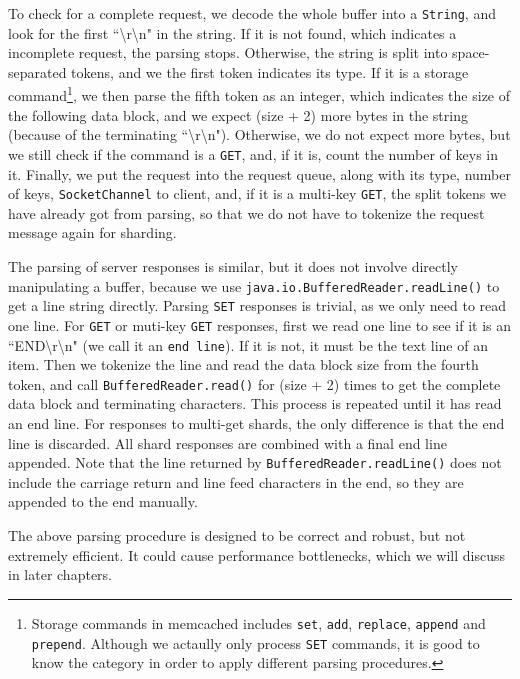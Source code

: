 To check for a complete request, we decode the whole buffer into a \texttt{String}, and look for the first ``\textbackslash r\textbackslash n" in the string. If it is not found, which indicates a incomplete request, the parsing stops. Otherwise, the string is split into space-separated tokens, and we the first token indicates its type. If it is a storage command\footnote{Storage commands in memcached includes \texttt{set}, \texttt{add}, \texttt{replace}, \texttt{append} and \texttt{prepend}. Although we actaully only process \texttt{SET} commands, it is good to know the category in order to apply different parsing procedures.}, we then parse the fifth token as an integer, which indicates the size of the following data block, and we expect (size + 2) more bytes in the string (because of the terminating ``\textbackslash r\textbackslash n"). Otherwise, we do not expect more bytes, but we still check if the command is a \texttt{GET}, and, if it is, count the number of keys in it. Finally, we put the request into the request queue, along with its type, number of keys, \texttt{SocketChannel} to client, and, if it is a multi-key \texttt{GET}, the split tokens we have already got from parsing, so that we do not have to tokenize the request message again for sharding. 

\label{parsing_response} The parsing of server responses is similar, but it does not involve directly manipulating a buffer, because we use \texttt{java.io.BufferedReader.readLine()} to get a line string directly. Parsing \texttt{SET} responses is trivial, as we only need to read one line. For \texttt{GET} or muti-key \texttt{GET} responses, first we read one line to see if it is an ``END\textbackslash r\textbackslash n" (we call it an \texttt{end line}). If it is not, it must be the text line of an item. Then we tokenize the line and read the data block size from the fourth token, and call \texttt{BufferedReader.read()} for (size + 2) times to get the complete data block and terminating characters. This process is repeated until it has read an end line. For responses to multi-get shards, the only difference is that the end line is discarded. All shard responses are combined with a final end line appended. Note that the line returned by \texttt{BufferedReader.readLine()} does not include the carriage return and line feed characters in the end, so they are appended to the end manually.

The above parsing procedure is designed to be correct and robust, but not extremely efficient. It could cause performance bottlenecks, which we will discuss in later chapters.

